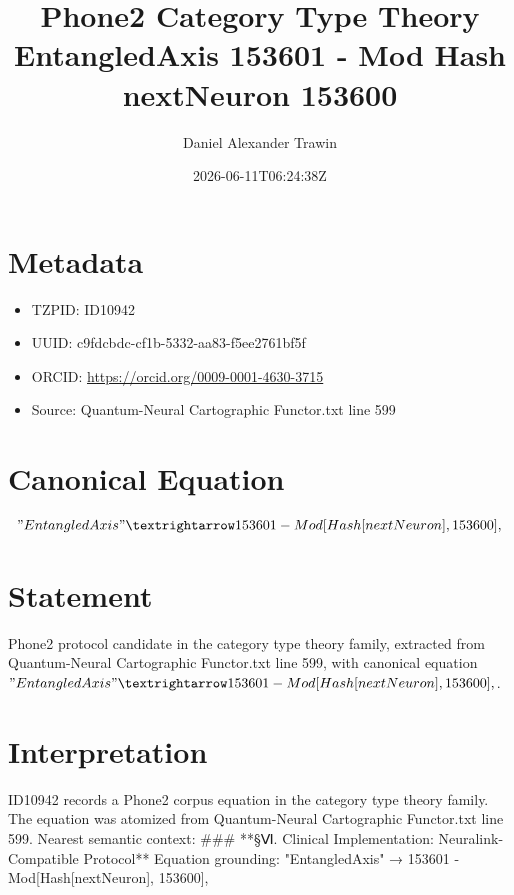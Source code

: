 \documentclass[11pt]{article}
\title{Phone2 Category Type Theory EntangledAxis 153601 - Mod Hash nextNeuron 153600}
\author{Daniel Alexander Trawin}
\date{2026-06-11T06:24:38Z}
\begin{document}
\maketitle
\section*{Metadata}
\begin{itemize}
\item TZPID: ID10942
\item UUID: c9fdcbdc-cf1b-5332-aa83-f5ee2761bf5f
\item ORCID: \url{https://orcid.org/0009-0001-4630-3715}
\item Source: Quantum-Neural Cartographic Functor.txt line 599
\end{itemize}
\section*{Canonical Equation}
\[
"EntangledAxis" → 153601 - Mod[Hash[nextNeuron], 153600],
\]
\section*{Statement}
Phone2 protocol candidate in the category type theory family, extracted from Quantum-Neural Cartographic Functor.txt line 599, with canonical equation $"EntangledAxis" → 153601 - Mod[Hash[nextNeuron], 153600],$.
\section*{Interpretation}
ID10942 records a Phone2 corpus equation in the category type theory family. The equation was atomized from Quantum-Neural Cartographic Functor.txt line 599. Nearest semantic context: ### **§Ⅵ. Clinical Implementation: Neuralink-Compatible Protocol** Equation grounding: "EntangledAxis" → 153601 - Mod[Hash[nextNeuron], 153600],
\end{document}
